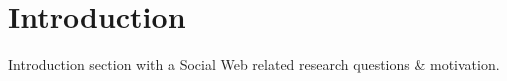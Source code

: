 \section{Introduction}

Introduction section with a Social Web related research questions \& motivation.